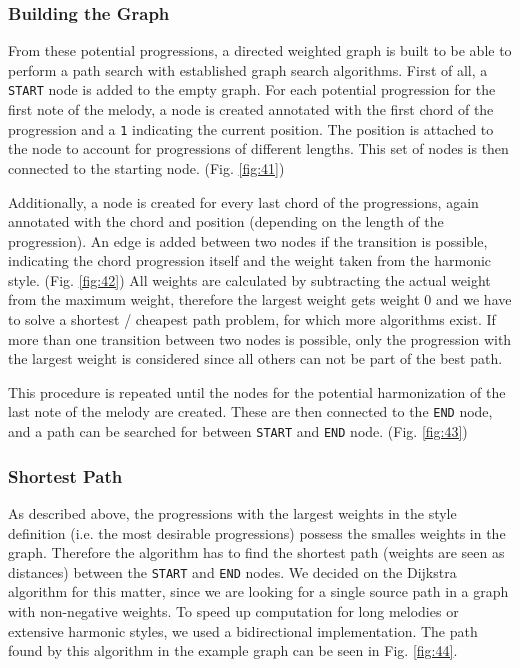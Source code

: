 \subsubsection{Building the Graph}
From these potential progressions, a directed weighted graph is built to be able to perform a path search with established graph search algorithms. First of all, a \texttt{START} node is added to the empty graph. For each potential progression for the first note of the melody, a node is created annotated with the first chord of the progression and a \texttt{1} indicating the current position. The position is attached to the node to account for progressions of different lengths. This set of nodes is then connected to the starting node. (Fig. \ref{fig:41})

Additionally, a node is created for every last chord of the progressions, again annotated with the chord and position (depending on the length of the progression). An edge is added between two nodes if the transition is possible, indicating the chord progression itself and the weight taken from the harmonic style. (Fig. \ref{fig:42}) All weights are calculated by subtracting the actual weight from the maximum weight, therefore the largest weight gets weight 0 and we have to solve a shortest / cheapest path problem, for which more algorithms exist. If more than one transition between two nodes is possible, only the progression with the largest weight is considered since all others can not be part of the best path.

This procedure is repeated until the nodes for the potential harmonization of the last note of the melody are created. These are then connected to the \texttt{END} node, and a path can be searched for between \texttt{START} and \texttt{END} node. (Fig. \ref{fig:43})


\subsubsection{Shortest Path}
As described above, the progressions with the largest weights in the style definition (i.e. the most desirable progressions) possess the smalles weights in the graph. Therefore the algorithm has to find the shortest path (weights are seen as distances) between the \texttt{START} and \texttt{END} nodes. We decided on the Dijkstra algorithm for this matter, since we are looking for a single source path in a graph with non-negative weights. To speed up computation for long melodies or extensive harmonic styles, we used a bidirectional implementation. The path found by this algorithm in the example graph can be seen in Fig. \ref{fig:44}.

